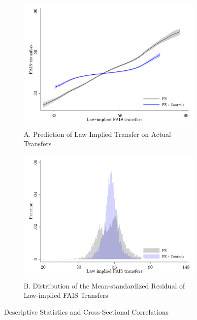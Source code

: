 \documentclass[dv_diss_main.tex]{subfiles}
\begin{document}
\begin{figure}[H] 
	\centering 
	
	\begin{subfigure}[t]{0.67\textwidth} 
		\centering
		\includegraphics[width=\linewidth]{figures/First_Stage_G1_v2.png}
		\caption*{\footnotesize A. Prediction of Law Implied Transfer on Actual Transfers} 
	\end{subfigure} 
	\vspace{0.1cm}
	
	\begin{subfigure}[t]{0.67\textwidth} 
		\centering
		\includegraphics[width=\linewidth]{figures/First_Stage_G3_v2.png}
		\caption*{\footnotesize B. Distribution of the Mean-standardized Residual of Law-implied FAIS Transfers} 
	\end{subfigure}
	\caption{Descriptive Statistics and Cross-Sectional Correlations}\label{fig:des5}
\parbox{\textwidth}{\small 
	\vspace{2eX}
	\footnotesize
	\firststage

}
\end{figure}
\end{document}
